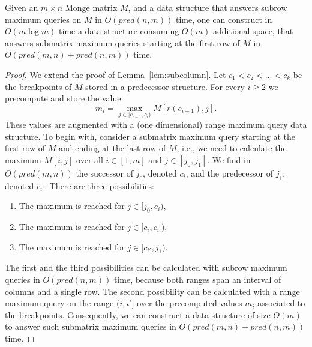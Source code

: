 \documentclass{llncs}
\newcommand{\pred}[1]{pred(#1)}
\begin{document}
\begin{lemma}
\label{lem:submatrix}
Given an $m\times n$ Monge matrix $M$, and a data structure that
answers subrow maximum queries on $M$ in $O(\pred{n,m})$ time, one can
construct in $O(m\log m)$ time  a data structure consuming $O(m)$
additional space, that answers submatrix maximum queries starting at
the first row of $M$ in $O(\pred{m,n}+\pred{n,m})$ time.
\end{lemma}

\begin{proof}
We extend the proof of Lemma~\ref{lem:subcolumn}.  Let $c_{1} < c_{2} < \ldots <c_{k}$
be the breakpoints of $M$ stored in a predecessor structure. For every $i \geq 2$
we precompute and store the value  $$m_{i}=\max_{j\in [c_{i-1},c_{i})} M[r(c_{i-1}),j].$$
These values are
augmented with a (one dimensional) range maximum query data structure. 
To begin with, consider a submatrix maximum query starting at the first row of $M$ and ending
at the last row of $M$, i.e., we need to calculate the maximum $M[i,j]$ over all $i\in [1,m]$ and $j\in [j_{0},j_{1}]$. 
We find in $O(\pred{m,n})$ the successor of $j_{0}$, denoted $c_{i}$, and the predecessor of $j_{1}$, denoted
$c_{i'}$. There are  three possibilities:
\begin{enumerate}
\item The maximum is reached for $j\in [j_{0},c_{i})$,
\item The maximum is reached for $j\in [c_{i},c_{i'})$,
\item The maximum is reached for $j\in [c_{i'},j_{1})$.
\end{enumerate}
The first and the third possibilities can be calculated with subrow maximum queries in $O(\pred{n,m})$ time, because
both ranges span an interval of columns and a single row.
The second possibility can be calculated with a range maximum query on the range $(i,i']$ over
the precomputed values $m_i$ associated to the breakpoints.
Consequently, we can construct a data structure of size $O(m)$ to answer such submatrix
maximum queries in $O(\pred{m,n}+\pred{n,m})$ time.


\end{proof}
\end{document}
